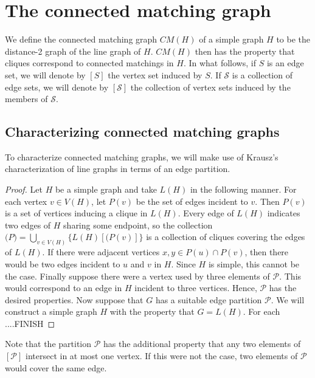 \section{The connected matching graph}

We define the connected matching graph $CM(H)$ of a simple graph $H$ to be the distance-2 graph of the line graph of $H$.  $CM(H)$ then has the property that cliques correspond to connected matchings in $H$.  In what follows, if $S$ is an edge set, we will denote by $[S]$ the vertex set induced by $S$.  If $\mathcal{S}$ is a collection of edge sets, we will denote by $[\mathcal{S}]$ the collection of vertex sets induced by the members of $\mathcal{S}$.

\subsection{Characterizing connected matching graphs}

To characterize connected matching graphs, we will make use of Krausz's characterization of line graphs in terms of an edge partition.  

\begin{proof}
	Let $H$ be a simple graph and take $L(H)$ in the following manner.  For each vertex $v\in V(H)$, let $P(v)$ be the set of edges incident to $v$.  Then $P(v)$ is a set of vertices inducing a clique in $L(H)$.  Every edge of $L(H)$ indicates two edges of $H$ sharing some endpoint, so the collection $\mathcal(P) = \bigcup_{v\in V(H)} \{L(H)[(P(v)]\}$ is a collection of cliques covering the edges of $L(H)$.  If there were adjacent vertices $x,y \in P(u)\cap P(v)$, then there would be two edges incident to $u$ and $v$ in $H$.  Since $H$ is simple, this cannot be the case.  Finally suppose there were a vertex used by three elements of $\mathcal{P}$.  This would correspond to an edge in $H$ incident to three vertices.  Hence, $\mathcal{P}$ has the desired properties. 
	Now suppose that $G$ has a suitable edge partition $\mathcal{P}$.  We will construct a simple graph $H$ with the property that $G = L(H)$.  For each ....FINISH
\end{proof}
Note that the partition $\mathcal{P}$ has the additional property that any two elements of $[\mathcal{P}]$ intersect in at most one vertex.  If this were not the case, two elements of $\mathcal{P}$ would cover the same edge.  

